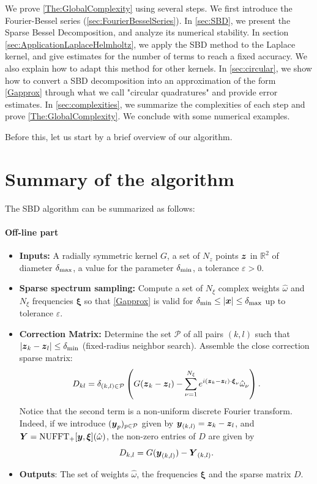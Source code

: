 \documentclass{article}
\begin{document}
We prove \autoref{The:GlobalComplexity} using several steps. We first introduce the Fourier-Bessel series (\autoref{sec:FourierBesselSeries}). In \autoref{sec:SBD}, we present the Sparse Bessel Decomposition, and analyze its numerical stability. In section \autoref{sec:ApplicationLaplaceHelmholtz}, we apply the SBD method to the Laplace kernel, and give estimates for the number of terms to reach a fixed accuracy. We also explain how to adapt this method for other kernels. In \autoref{sec:circular}, we show how to convert a SBD decomposition into an approximation of the form \eqref{Gapprox} through what we call "circular quadratures" and provide error estimates. In \autoref{sec:complexities}, we summarize the complexities of each step and prove \autoref{The:GlobalComplexity}. We conclude with some numerical examples. 

Before this, let us start by a brief overview of our algorithm.


\section{Summary of the algorithm}
\setcounter{equation}{0}
\label{sec:overview}

The SBD algorithm can be summarized as follows:
\paragraph{Off-line part}
\begin{itemize}
	\item[]\textbf{Inputs:} A radially symmetric kernel $G$, a set of $N_z$ points $\boldsymbol{z}$ in $\mathbb{R}^2$ of diameter $\delta_{\max}$, a value for the parameter $\delta_{\min}$, a tolerance $\varepsilon > 0$.
	\item[]\textbf{Sparse spectrum sampling:} Compute a set of $N_\xi$ complex weights $\hat{\omega}$ and $N_\xi$ frequencies $\boldsymbol{\xi}$ so that \eqref{Gapprox} is valid for $\delta_{\min} \leq |\boldsymbol{x}| \leq \delta_{\max}$ up to tolerance $\varepsilon$. 
	\item[]\textbf{Correction Matrix:} Determine the set $\mathcal{P}$ of all pairs $(k,l)$ such that $\left\lvert \boldsymbol{z}_k - \boldsymbol{z}_l \right\rvert \leq \delta_{\min}$ (fixed-radius neighbor search). Assemble the close correction sparse matrix:
	      \begin{equation}
	      	\label{defD}
	      	D_{kl} = \delta_{(k,l) \in \mathcal{P}} \left( G({\boldsymbol{z}_k - \boldsymbol{z}_l}) - \sum_{\nu = 1}^{N_{\xi}}e^{i (\boldsymbol{z}_k - \boldsymbol{z}_l)\cdot \boldsymbol{\xi}_\nu} \hat{\omega}_\nu\right).
	      \end{equation}
	      Notice that the second term is a non-uniform discrete Fourier transform. Indeed, if we introduce $(\boldsymbol{y}_p)_{p \in \mathcal{P}}$ given by 
	      $\boldsymbol{y}_{(k,l)} = \boldsymbol{z}_k - \boldsymbol{z}_l$, and $\boldsymbol{Y} = \textup{NUFFT}_+[\boldsymbol{y},\boldsymbol{\xi}](\hat{\omega})$, the non-zero entries of $D$ are given by
	      \[ D_{k,l} = G(\boldsymbol{y}_{(k,l)}) - \boldsymbol{Y}_{(k,l)}.\]
	\item[] \textbf{Outputs}: The set of weights $\hat{\omega}$, the frequencies $\boldsymbol{\xi}$ and the sparse matrix $D$. 
\end{itemize}
\end{document}
